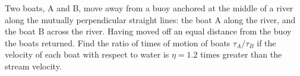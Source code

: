 
\item Two boats, A and B, move away from a buoy anchored at the middle of a river along the mutually perpendicular straight lines: the boat A along the river, and the boat B across the river. Having moved off an equal distance from the buoy the boats returned. Find the ratio of times of motion of boats $\tau_A / \tau_B$ if the velocity of each boat with respect to water is $\eta = 1.2$ times greater than the stream velocity.
